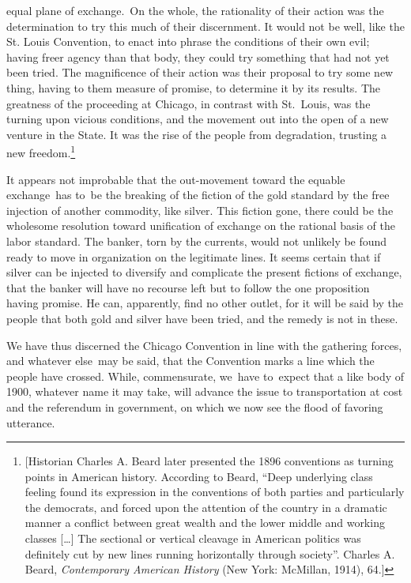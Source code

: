\documentclass[openany,nobib]{tufte-book}
\begin{document}
equal plane of exchange.~On the whole, the rationality of their action
was the determination to try this much of their discernment. It would
not be well, like the St. Louis Convention, to enact into phrase the
conditions of their own evil; having freer agency than that body, they
could try something that had not yet been tried. The magnificence of
their action was their proposal to try some new thing, having to them
measure of promise, to determine it by its results. The greatness of the
proceeding at Chicago, in contrast with St.~Louis, was the turning upon
vicious conditions, and the movement out into the open of a new venture
in the State. It was the rise of the people from degradation, trusting a
new freedom.\footnote{{[}Historian Charles A. Beard later presented the
  1896 conventions as turning points in American history. According to
  Beard, ``Deep underlying class feeling found its expression in the
  conventions of both parties and particularly the democrats, and forced
  upon the attention of the country in a dramatic manner a conflict
  between great wealth and the lower middle and working classes
  {[}\ldots{]} The sectional or vertical cleavage in American politics
  was definitely cut by new lines running horizontally through
  society''. Charles A. Beard, \emph{Contemporary American History} (New
  York: McMillan, 1914), 64.{]}}~

It appears not improbable that the out-movement toward the equable
exchange~has to~be the breaking of the fiction of the gold standard by
the free injection of another commodity, like silver. This fiction gone,
there could be the wholesome resolution toward unification of exchange
on the rational basis of the labor standard. The banker, torn by the
currents, would not unlikely be found ready to move in organization on
the legitimate lines. It seems certain that if silver can be injected to
diversify and complicate the present fictions of exchange, that the
banker will have no recourse left but to follow the one proposition
having promise. He can, apparently, find no other outlet, for it will be
said by the people that both gold and silver have been tried, and the
remedy is not in these.~

We have thus discerned the Chicago Convention in line with the gathering
forces, and whatever else~may be said, that the Convention marks a line
which the people have crossed. While, commensurate, we~have to~expect
that a like body of 1900, whatever name it may take, will advance the
issue to transportation at cost and the referendum in government, on
which we now see the flood of favoring utterance.~
\end{document}
